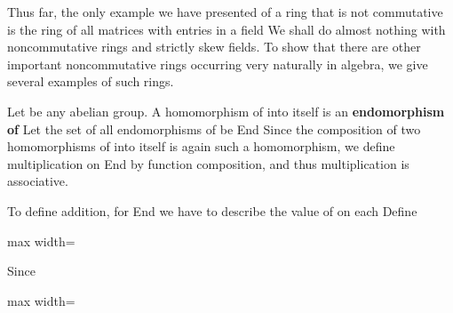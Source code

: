 \documentclass[11pt,oneside]{article}
\begin{document}
\fi
\renewcommand{\BookFooter}{Section 32 Noncommutative Examples}
\ifdefined\BookMaster\else\setcounter{page}{258}\fi
\BookNarrativetrue

\begin{BookBody}


\noindent Thus far, the only example we have presented of a ring that is not commutative is the ring  of all  matrices with entries in a field  We shall do almost nothing with noncommutative rings and strictly skew fields. To show that there are other important noncommutative rings occurring very naturally in algebra, we give several examples of such rings.


\noindent Let  be any abelian group. A homomorphism of  into itself is an\textbf{ endomorphism of}  Let the set of all endomorphisms of  be End Since the composition of two homomorphisms of  into itself is again such a homomorphism, we define multiplication on End by function composition, and thus multiplication is associative.

To define addition, for \BookInline{\phi,\allowbreak \psi \in } End we have to describe the value of \BookInline{(\phi + \psi )} on each  Define

\begin{center}\begin{adjustbox}{max width=\linewidth}\end{adjustbox}\end{center}

\noindent Since

\begin{center}\begin{adjustbox}{max width=\linewidth}\end{adjustbox}\end{center}


\end{BookBody}
\end{document}
